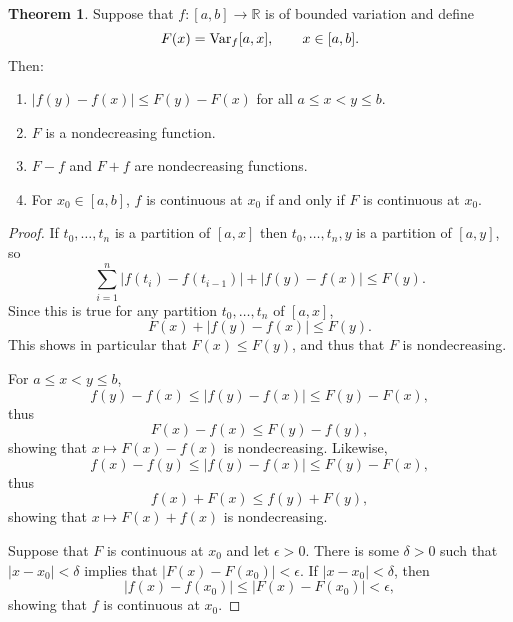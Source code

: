 \documentclass{article}
\newcommand{\Var}{\ensuremath\mathrm{Var}}
\theoremstyle{definition}
\newtheorem{theorem}{Theorem}
\theoremstyle{definition}
\begin{document}
\begin{theorem}
Suppose that $f:[a,b] \to \mathbb{R}$ is of bounded variation and define
\[
F(x) = \Var_f[a,x], \qquad x \in [a,b].
\]
Then:
\begin{enumerate}
\item $|f(y)-f(x)| \leq F(y)-F(x)$ for all $a \leq x < y \leq b$.
\item $F$ is a nondecreasing function.
\item $F-f$ and $F+f$ are nondecreasing functions.
\item For $x_0 \in [a,b]$, $f$ is continuous at $x_0$ if and only if $F$ is continuous at $x_0$.
\end{enumerate}
\label{nondecreasing}
\end{theorem}
\begin{proof}
If $t_0,\ldots,t_n$ is a partition of $[a,x]$ then
$t_0,\ldots,t_n,y$ is a partition of $[a,y]$, so
\[
\sum_{i=1}^n  |f(t_i)-f(t_{i-1})| +|f(y)-f(x)| \leq F(y).
\]
Since this is true for any partition $t_0,\ldots,t_n$ of $[a,x]$,
\[
F(x)+|f(y)-f(x)| \leq F(y).
\]
This shows in particular that $F(x) \leq F(y)$, and thus that $F$ is nondecreasing.

For $a \leq x < y \leq b$, 
\[
f(y)-f(x) \leq |f(y)-f(x)| \leq F(y)-F(x),
\]
thus
\[
F(x)-f(x) \leq F(y)-f(y),
\]
showing that $x \mapsto F(x)-f(x)$ is nondecreasing. Likewise,
\[
f(x)-f(y) \leq |f(y)-f(x)| \leq F(y)-F(x),
\]
thus
\[
f(x)+F(x) \leq f(y)+F(y),
\]
showing that $x \mapsto F(x)+f(x)$ is nondecreasing.

Suppose that $F$ is continuous at $x_0$ and let $\epsilon>0$. There is some $\delta>0$ such that
$|x-x_0|<\delta$ implies that $|F(x)-F(x_0)|<\epsilon$. If $|x-x_0|<\delta$, then
\[
|f(x)-f(x_0)| \leq |F(x)-F(x_0)|<\epsilon,
\]
showing that $f$ is continuous at $x_0$.


\end{proof}
\end{document}
